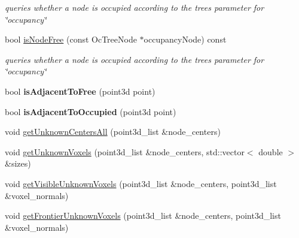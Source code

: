 \begin{DoxyCompactItemize}
\begin{DoxyCompactList}\small\item\em queries whether a node is occupied according to the tree\textquotesingle{}s parameter for \char`\"{}occupancy\char`\"{} \end{DoxyCompactList}\item 
bool \hyperlink{classCOctreeVPL_a7860fba1bc74082821400b77042e665c}{is\+Node\+Free} (const Oc\+Tree\+Node $\ast$occupancy\+Node) const \hypertarget{classCOctreeVPL_a7860fba1bc74082821400b77042e665c}{}\label{classCOctreeVPL_a7860fba1bc74082821400b77042e665c}

\begin{DoxyCompactList}\small\item\em queries whether a node is occupied according to the tree\textquotesingle{}s parameter for \char`\"{}occupancy\char`\"{} \end{DoxyCompactList}\item 
bool {\bfseries is\+Adjacent\+To\+Free} (point3d point)\hypertarget{classCOctreeVPL_a7b15d06126f1033098558703d7b6aa61}{}\label{classCOctreeVPL_a7b15d06126f1033098558703d7b6aa61}

\item 
bool {\bfseries is\+Adjacent\+To\+Occupied} (point3d point)\hypertarget{classCOctreeVPL_abed99cc7f1dd56a9af7ab8a093e1115a}{}\label{classCOctreeVPL_abed99cc7f1dd56a9af7ab8a093e1115a}

\item 
void \hyperlink{classCOctreeVPL_aa4af367169533315e24760fd9ccbc0ea}{get\+Unknown\+Centers\+All} (point3d\+\_\+list \&node\+\_\+centers)
\item 
void \hyperlink{classCOctreeVPL_a0fbfbebbd0fb49f80159c4dc6f028401}{get\+Unknown\+Voxels} (point3d\+\_\+list \&node\+\_\+centers, std\+::vector$<$ double $>$ \&sizes)
\item 
void \hyperlink{classCOctreeVPL_abc10ca1c6e7119fe22430034bebf22f7}{get\+Visible\+Unknown\+Voxels} (point3d\+\_\+list \&node\+\_\+centers, point3d\+\_\+list \&voxel\+\_\+normals)
\item 
void \hyperlink{classCOctreeVPL_a08bd4856960a12a49078a451e20efb87}{get\+Frontier\+Unknown\+Voxels} (point3d\+\_\+list \&node\+\_\+centers, point3d\+\_\+list \&voxel\+\_\+normals)
\end{DoxyCompactItemize}

